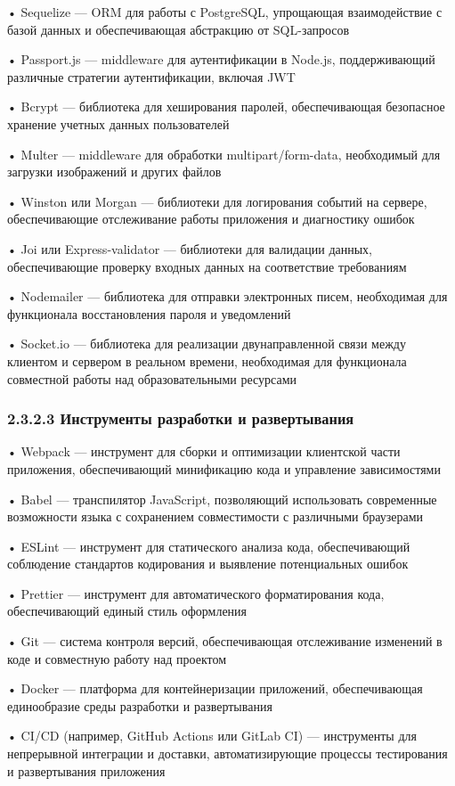 {  \par \redline • Sequelize — ORM для работы с PostgreSQL, упрощающая взаимодействие с базой данных и обеспечивающая абстракцию от SQL-запросов
  \par \redline • Passport.js — middleware для аутентификации в Node.js, поддерживающий различные стратегии аутентификации, включая JWT
  \par \redline • Bcrypt — библиотека для хеширования паролей, обеспечивающая безопасное хранение учетных данных пользователей
  \par \redline • Multer — middleware для обработки multipart/form-data, необходимый для загрузки изображений и других файлов
  \par \redline • Winston или Morgan — библиотеки для логирования событий на сервере, обеспечивающие отслеживание работы приложения и диагностику ошибок
  \par \redline • Joi или Express-validator — библиотеки для валидации данных, обеспечивающие проверку входных данных на соответствие требованиям
  \par \redline • Nodemailer — библиотека для отправки электронных писем, необходимая для функционала восстановления пароля и уведомлений
  \par \redline • Socket.io — библиотека для реализации двунаправленной связи между клиентом и сервером в реальном времени, необходимая для функционала совместной работы над образовательными ресурсами

  \subsubsection*{2.3.2.3 Инструменты разработки и развертывания}

  \par \redline • Webpack — инструмент для сборки и оптимизации клиентской части приложения, обеспечивающий минификацию кода и управление зависимостями
  \par \redline • Babel — транспилятор JavaScript, позволяющий использовать современные возможности языка с сохранением совместимости с различными браузерами
  \par \redline • ESLint — инструмент для статического анализа кода, обеспечивающий соблюдение стандартов кодирования и выявление потенциальных ошибок
  \par \redline • Prettier — инструмент для автоматического форматирования кода, обеспечивающий единый стиль оформления
  \par \redline • Git — система контроля версий, обеспечивающая отслеживание изменений в коде и совместную работу над проектом
  \par \redline • Docker — платформа для контейнеризации приложений, обеспечивающая единообразие среды разработки и развертывания
  \par \redline • CI/CD (например, GitHub Actions или GitLab CI) — инструменты для непрерывной интеграции и доставки, автоматизирующие процессы тестирования и развертывания приложения

  \par
}

